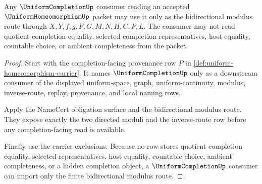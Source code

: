 \begin{theorem}
\label{thm:uniform-homeomorphism-completion-consumer-boundary}
Any $\UniformCompletionUp$ consumer reading an accepted $\UniformHomeomorphismUp$ packet may use it only as the bidirectional modulus route through $X,Y,f,g,F,G,M,N,H,C,P,L$. The consumer may not read quotient completion equality, selected completion representatives, host equality, countable choice, or ambient completeness from the packet.
\end{theorem}
\begin{proof}
Start with the completion-facing provenance row $P$ in \autoref{def:uniform-homeomorphism-carrier}. It names $\UniformCompletionUp$ only as a downstream consumer of the displayed uniform-space, graph, uniform-continuity, modulus, inverse-route, replay, provenance, and local naming rows.

Apply the NameCert obligation surface and the bidirectional modulus route. They expose exactly the two directed moduli and the inverse-route row before any completion-facing read is available.

Finally use the carrier exclusions. Because no row stores quotient completion equality, selected representatives, host equality, countable choice, ambient completeness, or a hidden completion object, a $\UniformCompletionUp$ consumer can import only the finite bidirectional modulus route.
\end{proof}

